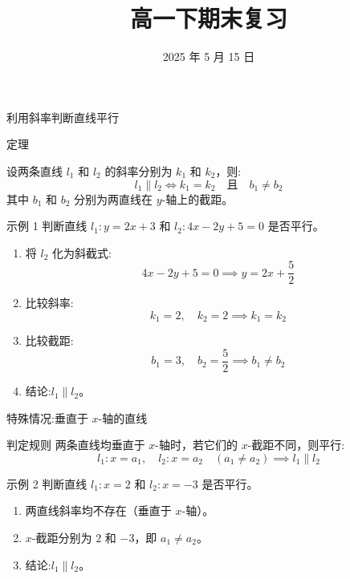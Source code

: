 \documentclass[aspectratio=169]{ctexbeamer}
\begin{document}
\title{高一下期末复习}
\date{2025 年 5 月 15 日}
\begin{frame}{}{}%
    \titlepage{}
\end{frame}







\begin{frame}[allowframebreaks]{利用斜率判断直线平行}
  \begin{block}{定理}

    设两条直线 \( l_1 \) 和 \( l_2 \) 的斜率分别为 \( k_1 \) 和 \( k_2 \)，则:
    \[
    l_1 \parallel l_2 \iff k_1 = k_2 \quad \text{且} \quad b_1 \neq b_2
    \]
    其中 \( b_1 \) 和 \( b_2 \) 分别为两直线在 \( y \)-轴上的截距。
  \end{block}

  \begin{exampleblock}{示例 1}
    判断直线 \( l_1: y = 2x + 3 \) 和 \( l_2: 4x - 2y + 5 = 0 \) 是否平行。
    \begin{enumerate}
      \item 将 \( l_2 \) 化为斜截式:
        \[
        4x - 2y + 5 = 0 \implies y = 2x + \frac{5}{2}
        \]
      \item 比较斜率:
        \[
        k_1 = 2, \quad k_2 = 2 \implies k_1 = k_2
        \]
      \item 比较截距:
        \[
        b_1 = 3, \quad b_2 = \frac{5}{2} \implies b_1 \neq b_2
        \]
      \item 结论:\( l_1 \parallel l_2 \)。
    \end{enumerate}
  \end{exampleblock}
\end{frame}



\begin{frame}{特殊情况:垂直于 \( x \)-轴的直线}
  \begin{block}{判定规则}
    两条直线均垂直于 \( x \)-轴时，若它们的 \( x \)-截距不同，则平行:
    \[
    l_1: x = a_1, \quad l_2: x = a_2 \quad (a_1 \neq a_2) \implies l_1 \parallel l_2
    \]
  \end{block}

  \begin{exampleblock}{示例 2}
    判断直线 \( l_1: x = 2 \) 和 \( l_2: x = -3 \) 是否平行。
    \begin{enumerate}
      \item 两直线斜率均不存在（垂直于 \( x \)-轴）。
      \item \( x \)-截距分别为 \( 2 \) 和 \( -3 \)，即 \( a_1 \neq a_2 \)。
      \item 结论:\( l_1 \parallel l_2 \)。
    \end{enumerate}
  \end{exampleblock}
\end{frame}
\end{document}
